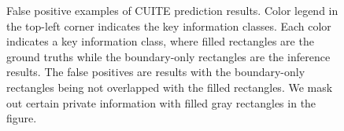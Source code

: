 \documentclass[10pt,twocolumn,letterpaper]{article}
\begin{document}
\begin{figure}
\begin{center}
\end{center}
   \caption{False positive examples of CUITE prediction results. Color legend in the top-left corner indicates the key information classes. Each color indicates a key information class, where filled rectangles are the ground truths while the boundary-only rectangles are the inference results. The false positives are results with the boundary-only rectangles being not overlapped with the filled rectangles. We mask out certain private information with filled gray rectangles in the figure.}
\label{fig:falsepositive}
\end{figure}
\end{document}
